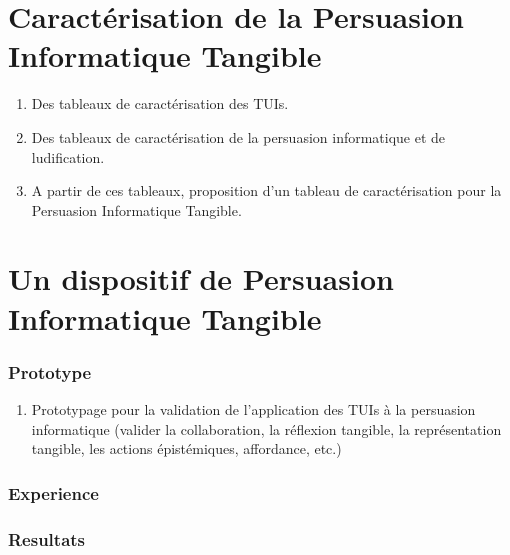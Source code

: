 \documentclass[]{pandoc/sigchi}
\begin{document}
\section{Caractérisation de la Persuasion Informatique
Tangible}\label{caractuxe9risation-de-la-persuasion-informatique-tangible}

\begin{enumerate}
\def\labelenumi{\arabic{enumi}.}
\itemsep1pt\parskip0pt
\item
  Des tableaux de caractérisation des TUIs.
\item
  Des tableaux de caractérisation de la persuasion informatique et de
  ludification.
\item
  A partir de ces tableaux, proposition d'un tableau de caractérisation
  pour la Persuasion Informatique Tangible.
\end{enumerate}

\section{Un dispositif de Persuasion Informatique
Tangible}\label{un-dispositif-de-persuasion-informatique-tangible}

\subsubsection{Prototype}\label{prototype}

\begin{enumerate}
\def\labelenumi{\arabic{enumi}.}
\itemsep1pt\parskip0pt
\item
  Prototypage pour la validation de l'application des TUIs à la
  persuasion informatique (valider la collaboration, la réflexion
  tangible, la représentation tangible, les actions épistémiques,
  affordance, etc.)
\end{enumerate}

\subsubsection{Experience}\label{experience}

\subsubsection{Resultats}\label{resultats}

\balance{}

\renewcommand\refname{\ldots{}}

\end{document}
